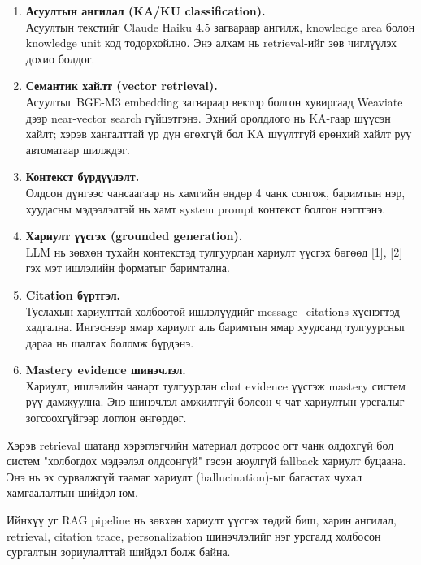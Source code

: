 \documentclass[12pt,A4]{report}
\newcommand{\eng}[1]{#1}
\begin{document}
\begin{enumerate}
    \item \textbf{Асуултын ангилал (KA/KU classification).} \\
    Асуултын текстийг \eng{Claude Haiku 4.5} загвараар ангилж, \eng{knowledge area} болон \eng{knowledge unit} код тодорхойлно. Энэ алхам нь retrieval-ийг зөв чиглүүлэх дохио болдог.

    \item \textbf{Семантик хайлт (vector retrieval).} \\
    Асуултыг \eng{BGE-M3} embedding загвараар вектор болгон хувиргаад \eng{Weaviate} дээр \eng{near-vector search} гүйцэтгэнэ. Эхний оролдлого нь KA-гаар шүүсэн хайлт; хэрэв хангалттай үр дүн өгөхгүй бол KA шүүлтгүй ерөнхий хайлт руу автоматаар шилждэг.

    \item \textbf{Контекст бүрдүүлэлт.} \\
    Олдсон дүнгээс чансаагаар нь хамгийн өндөр 4 чанк сонгож, баримтын нэр, хуудасны мэдээлэлтэй нь хамт \eng{system prompt} контекст болгон нэгтгэнэ.

    \item \textbf{Хариулт үүсгэх (grounded generation).} \\
    LLM нь зөвхөн тухайн контекстэд тулгуурлан хариулт үүсгэх бөгөөд [1], [2] гэх мэт ишлэлийн форматыг баримтална.

    \item \textbf{Citation бүртгэл.} \\
    Туслахын хариулттай холбоотой ишлэлүүдийг \eng{message\_citations} хүснэгтэд хадгална. Ингэснээр ямар хариулт аль баримтын ямар хуудсанд тулгуурсныг дараа нь шалгах боломж бүрдэнэ.

    \item \textbf{Mastery evidence шинэчлэл.} \\
    Хариулт, ишлэлийн чанарт тулгуурлан \eng{chat evidence} үүсгэж \eng{mastery} систем рүү дамжуулна. Энэ шинэчлэл амжилтгүй болсон ч чат хариултын урсгалыг зогсоохгүйгээр логлон өнгөрдөг.
\end{enumerate}

Хэрэв retrieval шатанд хэрэглэгчийн материал дотроос огт чанк олдохгүй бол систем "холбогдох мэдээлэл олдсонгүй" гэсэн аюулгүй fallback хариулт буцаана. Энэ нь эх сурвалжгүй таамаг хариулт (hallucination)-ыг багасгах чухал хамгаалалтын шийдэл юм.

Ийнхүү уг RAG pipeline нь зөвхөн хариулт үүсгэх төдий биш, харин ангилал, retrieval, citation trace, personalization шинэчлэлийг нэг урсгалд холбосон сургалтын зориулалттай шийдэл болж байна.
\end{document}
